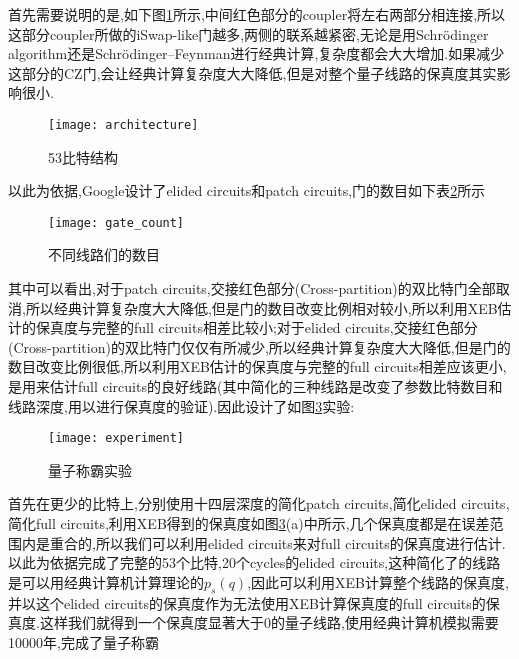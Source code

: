 首先需要说明的是,如下图\ref{architecture}所示,中间红色部分的coupler将左右两部分相连接,所以这部分coupler所做的iSwap-like门越多,两侧的联系越紧密,无论是用Schrödinger algorithm还是Schrödinger–Feynman进行经典计算,复杂度都会大大增加.如果减少这部分的CZ门,会让经典计算复杂度大大降低,但是对整个量子线路的保真度其实影响很小.
\begin{figure}
	\centering
	\texttt{[image: architecture]}
	\caption{53比特结构} 
	\label{architecture}
\end{figure}

以此为依据,Google设计了elided circuits和patch circuits,门的数目如下表\ref{gate_count}所示
\begin{figure}
	\centering
	\texttt{[image: gate\_count]}
	\caption{不同线路们的数目} 
	\label{gate_count}
\end{figure}

其中可以看出,对于patch circuits,交接红色部分(Cross-partition)的双比特门全部取消,所以经典计算复杂度大大降低,但是门的数目改变比例相对较小,所以利用XEB估计的保真度与完整的full circuits相差比较小;对于elided circuits,交接红色部分(Cross-partition)的双比特门仅仅有所减少,所以经典计算复杂度大大降低,但是门的数目改变比例很低,所以利用XEB估计的保真度与完整的full circuits相差应该更小,是用来估计full circuits的良好线路(其中简化的三种线路是改变了参数比特数目和线路深度,用以进行保真度的验证).因此设计了如图\ref{experiment}实验:
\begin{figure}
	\centering
	\texttt{[image: experiment]}
	\caption{量子称霸实验} 
	\label{experiment}
\end{figure}

首先在更少的比特上,分别使用十四层深度的简化patch circuits,简化elided circuits,简化full circuits,利用XEB得到的保真度如图\ref{experiment}(a)中所示,几个保真度都是在误差范围内是重合的,所以我们可以利用elided circuits来对full circuits的保真度进行估计.以此为依据完成了完整的53个比特,20个cycles的elided circuits,这种简化了的线路是可以用经典计算机计算理论的$p_{s}(q)$,因此可以利用XEB计算整个线路的保真度,并以这个elided circuits的保真度作为无法使用XEB计算保真度的full circuits的保真度.这样我们就得到一个保真度显著大于0的量子线路,使用经典计算机模拟需要10000年,完成了量子称霸
